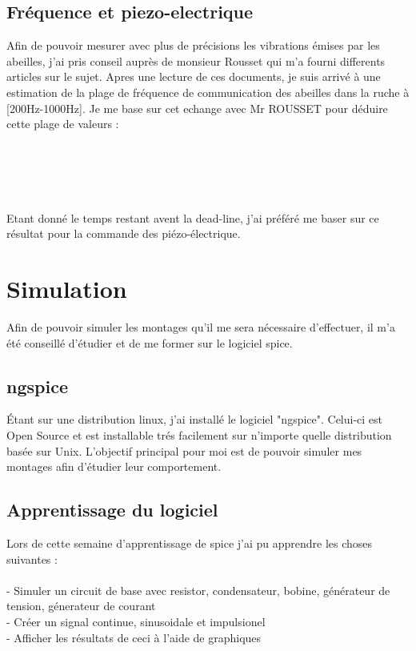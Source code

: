 \documentclass[11pt,french,a4paper]{article}
\begin{document}
\subsection{Fréquence et piezo-electrique}
Afin de pouvoir mesurer avec plus de précisions les vibrations émises par les abeilles, j'ai pris conseil auprès de monsieur Rousset qui m'a fourni differents articles sur le sujet.
Apres une lecture de ces documents, je suis arrivé à une estimation de la plage de fréquence de communication des abeilles dans la ruche à [200Hz-1000Hz]. Je me base sur cet echange avec Mr ROUSSET pour déduire cette plage de valeurs : \\ 
\\
\\
\\ \\ \\Etant donné le temps restant avent la dead-line, j'ai préféré me baser sur ce résultat pour la commande des piézo-électrique.

\newpage
\section{Simulation}
Afin de pouvoir simuler les montages qu'il me sera nécessaire d'effectuer, il m'a été conseillé d'étudier et de me former sur le logiciel spice.

\subsection{ngspice}
Étant sur une distribution linux, j'ai installé le logiciel "ngspice". Celui-ci est Open Source et est installable trés facilement sur n'importe quelle distribution basée sur Unix. L'objectif principal pour moi est de pouvoir simuler mes montages afin d'étudier leur comportement. 

\subsection{Apprentissage du logiciel}
Lors de cette semaine d'apprentissage de spice j'ai pu apprendre les choses suivantes :
\\
\\
- Simuler un circuit de base avec resistor, condensateur, bobine, générateur de tension, génerateur de courant\\
- Créer un signal continue, sinusoidale et impulsionel \\
- Afficher les résultats de ceci à l'aide de graphiques \\
\end{document}
